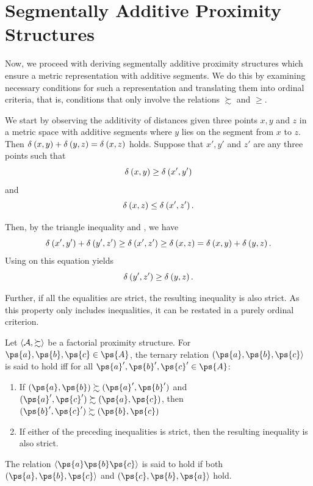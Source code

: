 \section{Segmentally Additive Proximity Structures} \label{sect-seg-add-ps}

Now, we proceed with deriving segmentally additive proximity structures which ensure a metric representation with additive segments.
We do this by examining necessary conditions for such a representation and translating them into ordinal criteria, that is, conditions that only involve the relations $\succsim$ and $\geq$.

We start by observing the additivity of distances given three points $x, y$ and $z$ in a metric space with additive segments where $y$ lies on the segment from $x$ to $z$.
Then $\operatorname{\delta}_{} \left( x, y \right) + \operatorname{\delta}_{} \left( y, z \right) = \operatorname{\delta}_{} \left( x, z \right)$ holds.
Suppose that $x', y'$ and $z'$ are any three points such that
\begin{equation} \label{seg-add-eq1}
	\operatorname{\delta}_{} \left( x, y \right) \geq \operatorname{\delta}_{} \left( x', y' \right)
\end{equation}
and
\begin{equation} \label{seg-add-eq2}
	\operatorname{\delta}_{} \left( x, z \right) \leq \operatorname{\delta}_{} \left( x', z' \right).
\end{equation}

Then, by the triangle inequality and , we have
\begin{equation*}
	\operatorname{\delta}_{} \left( x', y' \right) + \operatorname{\delta}_{} \left( y', z' \right) \geq \operatorname{\delta}_{} \left( x', z' \right) \geq \operatorname{\delta}_{} \left( x, z \right) = \operatorname{\delta}_{} \left( x, y \right) + \operatorname{\delta}_{} \left( y, z \right).
\end{equation*}
Using  on this equation yields
\begin{equation*}
	\operatorname{\delta}_{} \left( y', z' \right) \geq \operatorname{\delta}_{} \left( y, z \right).
\end{equation*}

Further, if all the equalities are strict, the resulting inequality is also strict.
As this property only includes inequalities, it can be restated in a purely ordinal criterion.


\begin{defi}  %
	Let $\langle \mathcal{A}, \succsim \rangle$ be a factorial proximity structure. For $\ps{a}, \ps{b}, \ps{c} \in  \ps{A}$, the ternary relation $(\ps{a}, \ps{b}, \ps{c} \rangle$ is said to hold iff for all $\ps{a}', \ps{b}', \ps{c}' \in \ps{A}$:
	\begin{enumerate}
		\item If $(\ps{a} ,\ps{b}) \succsim (\ps{a}', \ps{b}')$ and  $(\ps{a}', \ps{c}') \succsim (\ps{a}, \ps{c})$, then  $(\ps{b}', \ps{c}') \succsim (\ps{b}, \ps{c})$
		\item If either of the preceding inequalities is strict, then the resulting inequality is also strict.
	\end{enumerate}
	The relation $\langle \ps{a}\ps{b}\ps{c} \rangle$ is said to hold if both $(\ps{a}, \ps{b}, \ps{c} \rangle$ and $(\ps{c}, \ps{b}, \ps{a}\rangle$ hold.
\end{defi}

